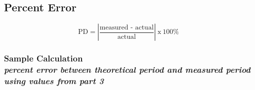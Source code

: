 %
%
%

\subsection{Percent Error}
\vspace{0.5cm}
\begin{equation}
	\text{PD}	= \left| \frac{\text{measured - actual}}{\text{actual}} \right|\: \text{x}\: 100\%
	\label{eq:perror}
\end{equation}

\subsubsection{Sample Calculation \\ {\normalfont \small\textit{percent error between theoretical period and measured period using values from part 3}}}

